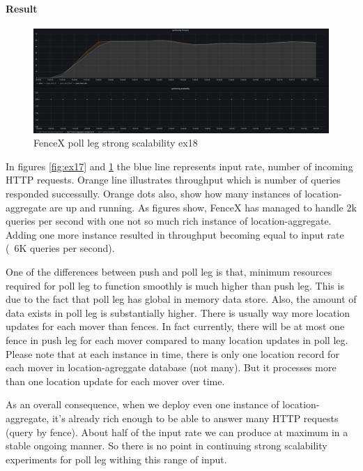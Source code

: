 \documentclass[a4]{report}
\begin{document}
        \paragraph{Result}
        \begin{figure}[ht]
            \caption{FenceX poll leg strong scalability ex18}
            \label{fig:ex18}
            \includegraphics[scale=0.4]{images/evaluation/ex18-benchmarking-ongoing-2per4sec.png}
        \end{figure}

        In figures \ref{fig:ex17} and \ref{fig:ex18} the blue line represents input rate, number of incoming HTTP
        requests.
        Orange line illustrates throughput which is number of queries responded successully.
        Orange dots also, show how many instances of location-aggregate are up and running.
        As figures show, FenceX has managed to handle 2k queries
        per second with one not so much rich instance of location-aggregate.
        Adding one more instance resulted in throughput becoming equal to input rate (~6K queries per second).

        One of the differences between push and poll leg is that, minimum resources required for poll leg to function
        smoothly is much higher than push leg.
        This is due to the fact that poll leg has global in memory data store.
        Also, the amount of data exists in poll leg is substantially higher.
        There is usually way more location updates for each mover than fences.
        In fact currently, there will be at most one fence in push leg for each mover compared to many location updates
        in poll leg.
        Please note that at each instance in time, there is only one location record for each mover in location-agreggate
        database (not many).
        But it processes more than one location update for each mover over time.

        As an overall consequence, when we deploy even one instance of location-aggregate, it's already rich enough to be
        able to answer many HTTP requests (query by fence).
        About half of the input rate we can produce at maximum in a stable ongoing manner.
        So there is no point in continuing strong scalability experiments for poll leg withing this range of input.
\end{document}
